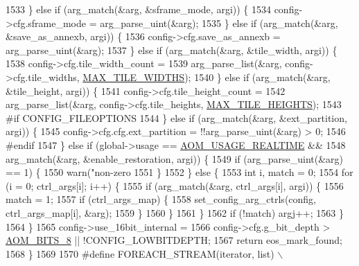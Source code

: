 \begin{DoxyCodeInclude}
{{{{{{{{{{{{{{{{{{{{1533     \} \textcolor{keywordflow}{else} \textcolor{keywordflow}{if} (arg\_match(&arg, &sframe\_mode, argi)) \{
1534       config->cfg.sframe\_mode = arg\_parse\_uint(&arg);
1535     \} \textcolor{keywordflow}{else} \textcolor{keywordflow}{if} (arg\_match(&arg, &save\_as\_annexb, argi)) \{
1536       config->cfg.save\_as\_annexb = arg\_parse\_uint(&arg);
1537     \} \textcolor{keywordflow}{else} \textcolor{keywordflow}{if} (arg\_match(&arg, &tile\_width, argi)) \{
1538       config->cfg.tile\_width\_count =
1539           arg\_parse\_list(&arg, config->cfg.tile\_widths, \hyperlink{aom__encoder_8h_a3ec4904ea175471a03d10705f384d07c}{MAX\_TILE\_WIDTHS});
1540     \} \textcolor{keywordflow}{else} \textcolor{keywordflow}{if} (arg\_match(&arg, &tile\_height, argi)) \{
1541       config->cfg.tile\_height\_count =
1542           arg\_parse\_list(&arg, config->cfg.tile\_heights, \hyperlink{aom__encoder_8h_a446aae868ff07f3971d9e84b6602a890}{MAX\_TILE\_HEIGHTS});
1543 \textcolor{preprocessor}{#if CONFIG\_FILEOPTIONS}
1544     \} \textcolor{keywordflow}{else} \textcolor{keywordflow}{if} (arg\_match(&arg, &ext\_partition, argi)) \{
1545       config->cfg.cfg.ext\_partition = !!arg\_parse\_uint(&arg) > 0;
1546 \textcolor{preprocessor}{#endif}
1547     \} \textcolor{keywordflow}{else} \textcolor{keywordflow}{if} (global->usage == \hyperlink{group__encoder_gae2cc24d3083099df8eb60ad65f81c62f}{AOM\_USAGE\_REALTIME} &&
1548                arg\_match(&arg, &enable\_restoration, argi)) \{
1549       \textcolor{keywordflow}{if} (arg\_parse\_uint(&arg) == 1) \{
1550         warn(\textcolor{stringliteral}{"non-zero %
1551       \}
1552     \} \textcolor{keywordflow}{else} \{
1553       \textcolor{keywordtype}{int} i, match = 0;
1554       \textcolor{keywordflow}{for} (i = 0; ctrl\_args[i]; i++) \{
1555         \textcolor{keywordflow}{if} (arg\_match(&arg, ctrl\_args[i], argi)) \{
1556           match = 1;
1557           \textcolor{keywordflow}{if} (ctrl\_args\_map) \{
1558             set\_config\_arg\_ctrls(config, ctrl\_args\_map[i], &arg);
1559           \}
1560         \}
1561       \}
1562       \textcolor{keywordflow}{if} (!match) argj++;
1563     \}
1564   \}
1565   config->use\_16bit\_internal =
1566       config->cfg.g\_bit\_depth > \hyperlink{group__codec_gga6ed0e98eba4651c1ad845e39498e4153a4c7f55539160206a3fbb2a6cfc9ef89c}{AOM\_BITS\_8} || !CONFIG\_LOWBITDEPTH;
1567   \textcolor{keywordflow}{return} eos\_mark\_found;
1568 \}
1569 
1570 \textcolor{preprocessor}{#define FOREACH\_STREAM(iterator, list)                 \(\backslash\)}
}}}}}}}}}}}}}}}}}}}}}
\end{DoxyCodeInclude}
